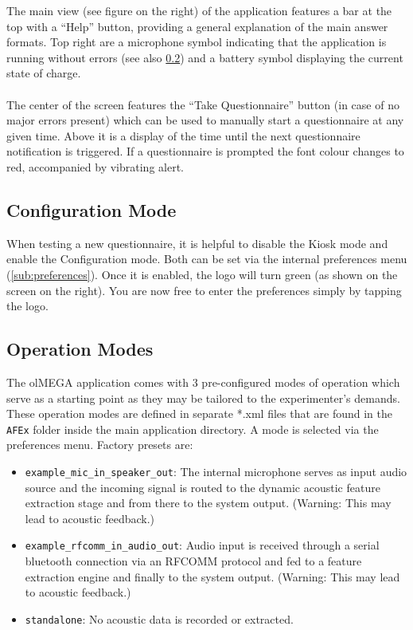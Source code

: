 \documentclass[11pt,a4paper,titlepage]{article}
\newcommand\ClrSquare[1]{\textcolor{#1}{\rule{7pt}{7pt}}}
\begin{document}
The main view (see figure on the right) of the application features a bar at the top with a ``Help'' button, providing a general explanation of the main answer formats. Top right are a microphone symbol indicating that the application is running without errors (see also \ref{sub:operationmode}) and a battery symbol displaying the current state of charge.\\
\\
The center of the screen features the ``Take Questionnaire'' button (in case of no major errors present) which can be used to manually start a questionnaire at any given time. Above it is a display of the time until the next questionnaire notification is triggered. If a questionnaire is prompted the font colour changes to red, accompanied by vibrating alert.



\subsection{Configuration Mode}\label{sub:experimenter}

When testing a new questionnaire, it is helpful to disable the Kiosk mode and enable the Configuration mode. Both can be set via the internal preferences menu (\ref{sub:preferences}). Once it is enabled, the logo will turn green (as shown on the screen on the right). You are now free to enter the preferences simply by tapping the logo. 


\subsection{Operation Modes}\label{sub:operationmode}

The olMEGA application comes with 3 pre-configured modes of operation which serve as a starting point as they may be tailored to the experimenter's demands. These operation modes are defined in separate *.xml files that are found in the \texttt{AFEx} folder inside the main application directory. A mode is selected via the preferences menu. Factory presets are:

\begin{itemize}[label=\ClrSquare{jadeRed}]
	\item \texttt{example\_mic\_in\_speaker\_out}: The internal microphone serves as input audio source and the incoming signal is routed to the dynamic acoustic feature extraction stage and from there to the system output. (Warning: This may lead to acoustic feedback.)
	\item \texttt{example\_rfcomm\_in\_audio\_out}: Audio input is received through a serial bluetooth connection via an RFCOMM protocol and fed to a feature extraction engine and finally to the system output. (Warning: This may lead to acoustic feedback.)
	\item \texttt{standalone}: No acoustic data is recorded or extracted.
\end{itemize}
\end{document}
